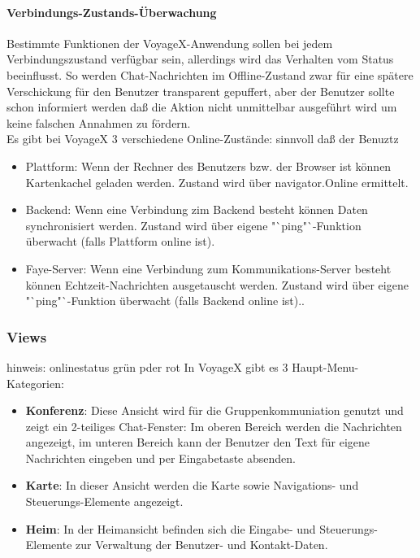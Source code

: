 \paragraph{Verbindungs-Zustands-Überwachung}
Bestimmte Funktionen der VoyageX-Anwendung sollen bei jedem Verbindungszustand verfügbar sein, allerdings
wird das Verhalten vom Status beeinflusst. So werden Chat-Nachrichten im Offline-Zustand zwar für eine
spätere Verschickung für den Benutzer transparent gepuffert, aber der Benutzer sollte schon informiert
werden daß die Aktion nicht unmittelbar ausgeführt wird um keine falschen Annahmen zu fördern.\\
Es gibt bei VoyageX 3 verschiedene Online-Zustände:
sinnvoll daß der Benuztz
	\begin{itemize}
		\item Plattform: Wenn der Rechner des Benutzers bzw. der Browser ist können Kartenkachel geladen werden. Zustand wird über navigator.Online ermittelt.
		\item Backend: Wenn eine Verbindung zim Backend besteht können Daten synchronisiert werden. Zustand wird über eigene "`ping"`-Funktion  überwacht (falls Plattform online ist).
		\item Faye-Server: Wenn eine Verbindung zum Kommunikations-Server besteht können Echtzeit-Nachrichten ausgetauscht werden. Zustand wird über eigene "`ping"`-Funktion  überwacht (falls Backend online ist)..
	\end{itemize}


\subsubsection{Views}

hinweis: onlinestatus grün pder rot
In VoyageX gibt es 3 Haupt-Menu-Kategorien:
\begin{itemize}[leftmargin=*,noitemsep,topsep=1ex,parsep=0pt,partopsep=0pt]
\item \textbf{Konferenz}: Diese Ansicht wird für die Gruppenkommuniation genutzt und zeigt ein 2-teiliges Chat-Fenster: Im oberen Bereich werden die Nachrichten angezeigt, im unteren Bereich kann der Benutzer den Text für eigene Nachrichten eingeben und per Eingabetaste absenden. 
\item \textbf{Karte}: In dieser Ansicht werden die Karte sowie Navigations- und Steuerungs-Elemente angezeigt.
\item \textbf{Heim}: In der Heimansicht befinden sich die Eingabe- und Steuerungs-Elemente zur Verwaltung der Benutzer- und Kontakt-Daten.
\end{itemize}
	
